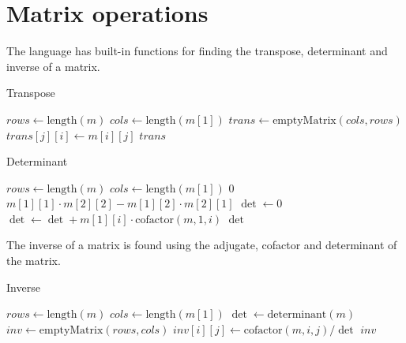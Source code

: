 \section{Matrix operations}\label{sec:matrix-ops}

The language has built-in functions for finding the transpose, determinant and inverse of a matrix.

\begin{algorithm}
    \caption{Transpose}
    \begin{algorithmic}
            \State $rows \gets \text{length}(m)$
            \State $cols \gets \text{length}(m[1])$
            \State $trans \gets \text{emptyMatrix}(cols, rows)$
                    \State $trans[j][i] \gets m[i][j]$
                \EndFor
            \EndFor
            \State \Return $trans$
        \EndFunction
    \end{algorithmic}\label{alg:algorithm8}
\end{algorithm}

\begin{algorithm}
    \caption{Determinant}
    \begin{algorithmic}
            \State $rows \gets \text{length}(m)$
            \State $cols \gets \text{length}(m[1])$
                \State \Return $0$
            \EndIf
                \State \Return $m[1][1] \cdot m[2][2] - m[1][2] \cdot m[2][1]$
            \EndIf
            \State $\det \gets 0$
                \State $\det \gets \det + m[1][i] \cdot \text{cofactor}(m, 1, i)$
            \EndFor
            \State \Return $\det$
        \EndFunction
    \end{algorithmic}\label{alg:algorithm9}
\end{algorithm}

The inverse of a matrix is found using the adjugate, cofactor and determinant of the matrix.

\begin{algorithm}
    \caption{Inverse}
    \begin{algorithmic}
            \State $rows \gets \text{length}(m)$
            \State $cols \gets \text{length}(m[1])$
            \State $\det \gets \text{determinant}(m)$
                \State \Return {}
            \EndIf
            \State $inv \gets \text{emptyMatrix}(rows, cols)$
                    \State $inv[i][j] \gets \text{cofactor}(m, i, j) / \det$
                \EndFor
            \EndFor
            \State \Return $inv$
        \EndFunction
    \end{algorithmic}\label{alg:algorithm10}
\end{algorithm}